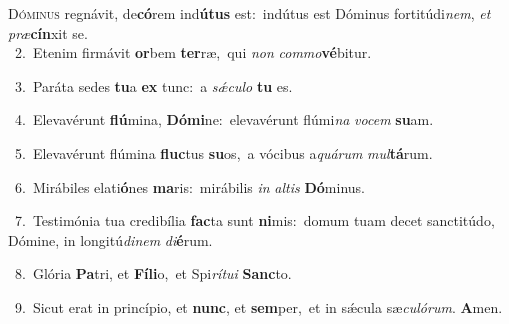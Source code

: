 \lettrine{\initial\textcolor{\initialcolor}{D}}{óminus} regnávit, de\-\textbf{có}\-rem ind\-\textbf{ú}\-\textbf{tus} est:~\star indútus est Dóminus fortitúdi\-\textit{nem}\-, \textit{et} \textit{præ}\-\textbf{cín}xit se.\\
{\numbfont\textcolor{\numbcolor}{~2.}}~Etenim firmávit \textbf{or}\-bem \textbf{ter}\-ræ,~\star qui \textit{non} \textit{com}\-\textit{mo}\textbf{vé}bitur.\par
{\numbfont\textcolor{\numbcolor}{~3.}}~Paráta sedes \textbf{tu}\-a \textbf{ex} tunc:~\star a \textit{sǽ}\-\textit{cu}\textit{lo} \textbf{tu} es.\par
{\numbfont\textcolor{\numbcolor}{~4.}}~Elevavérunt \textbf{flú}\-mina, \textbf{Dó}\-\textbf{mi}ne:~\star elevavérunt flúmi\textit{na} \textit{vo}\-\textit{cem} \textbf{su}\-am.\par
{\numbfont\textcolor{\numbcolor}{~5.}}~Elevavérunt flúmina \textbf{fluc}\-tus \textbf{su}\-os,~\star a vócibus a\-\textit{quá}\-\textit{rum} \textit{mul}\-\textbf{tá}rum.\par
{\numbfont\textcolor{\numbcolor}{~6.}}~Mirábiles elati\-\textbf{ó}\-nes \textbf{ma}\-ris:~\star mirábilis \textit{in} \textit{al}\-\textit{tis} \textbf{Dó}\-minus.\par
{\numbfont\textcolor{\numbcolor}{~7.}}~Testimónia tua credibília \textbf{fac}\-ta sunt \textbf{ni}\-mis:~\star domum tuam decet sanctitúdo, Dómine, in longitú\-\textit{di}\-\textit{nem} \textit{di}\-\textbf{é}rum.\par
{\numbfont\textcolor{\numbcolor}{~8.}}~Glória \textbf{Pa}\-tri, et \textbf{Fí}\-\textbf{li}o,~\star et Spi\-\textit{rí}\-\textit{tu}\textit{i} \textbf{Sanc}\-to.\par
{\numbfont\textcolor{\numbcolor}{~9.}}~Sicut erat in princípio, et \textbf{nunc}\-, et \textbf{sem}\-per,~\star et in sǽcula sæ\-\textit{cu}\-\textit{ló}\textit{rum}. \textbf{A}\-men.\par
